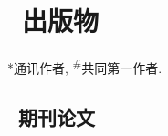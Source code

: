 \newcommand{\Revision}{\textit{返修}}
\newcommand{\Review}{\textit{审稿}}
\newcommand{\Submitted}{\textit{投稿}}
\newcommand{\CS}{*} %
\newcommand{\CF}{\textsuperscript{\#}} %

\section{\texorpdfstring{\faBook\ 出版物}{出版物}}
\CS 通讯作者, \CF 共同第一作者.

\subsection*{\texorpdfstring{\faBook\ 期刊论文}{期刊论文}}
